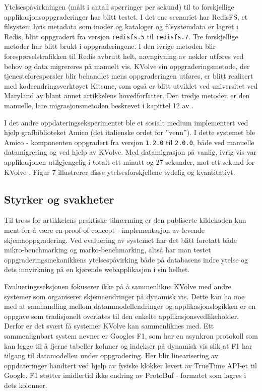 Ytelsespåvirkningen (målt i antall spørringer per sekund) til to forskjellige applikasjonsoppgraderinger har blitt testet. I det ene scenariet har RedisFS, et filsystem hvis metadata som inoder og kataloger og filsystemdata er lagret i Redis, blitt oppgradert fra versjon \texttt{redisfs.5} til \texttt{redisfs.7}. Tre forskjellige metoder har blitt brukt i oppgraderingene. I den ivrige metoden blir forespørselstrafikken til Redis avbrutt helt, navngivning av nøkler utføres ved behov og data migrereres på manuelt vis. KVolve sin oppgraderingsmetode, der tjenesteforespørsler blir behandlet mens oppgraderingen utføres, er blitt realisert med kodeendringsverktøyet Kitsune, som også er blitt utviklet ved universitet ved Maryland av blant annet artikkelens hovedforfatter. Den tredje metoden er den manuelle, late migrasjonsmetoden beskrevet i kapittel 12 av \cite{sadalage2013}.

I det andre oppdateringseksperimentet ble et sosialt medium implementert ved hjelp grafbiblioteket Amico (det italienske ordet for ''venn''). I dette systemet ble Amico - komponenten oppgradert fra versjon \texttt{1.2.0} til \texttt{2.0.0}, både ved manuelle datamigrering og ved hjelp av KVolve. Med datamigrasjon på vanlig, ivrig vis var applikasjonen utilgjengelig i totalt ett minutt og 27 sekunder, mot ett sekund for KVolve \citep{saur2016}. Figur 7 illustrerer disse ytelsesforskjellene tydelig og kvantitativt.

\subsection{Styrker og svakheter}
Til tross for artikkelens praktiske tilnærming er den publiserte kildekoden kun ment for å være en proof-of-concept - implementasjon av levende skjemaoppgradering. Ved evaluering av systemet har det blitt foretatt både mikro-benchmarking og marko-benchmarking, altså har man testet oppgraderingsmekanikkens ytelsespåvirking både på databasens indre ytelse og dets innvirkning på en kjørende webapplikasjon i sin helhet.

Evalueringsseksjonen fokuserer ikke på å sammenlikne KVolve med andre systemer som organiserer skjemaendringer på dynamisk vis. Dette kan ha noe med at samhandling mellom datammodellendringer og applikasjonslogikken er en oppgave som tradisjonelt overlates til den enkelte applikasjonsvedlikeholder. Derfor er det svært få systemer KVolve kan sammenliknes med. Ett sammenlignbart system \cite{saur2016} nevner er Googles F1, som har en asynkron protokoll som kan legge til å fjerne tabeller kolnner og indekser på dynamisk vis slik at F1 har tilgang til datamodellen under oppgradering. Her blir linearisering av oppdateringer handtert ved hjelp av fysiske klokker levert av TrueTime API-et til Google. F1 støtter imidlertid ikke endring av ProtoBuf - formatet som lagres i dets kolonner.

